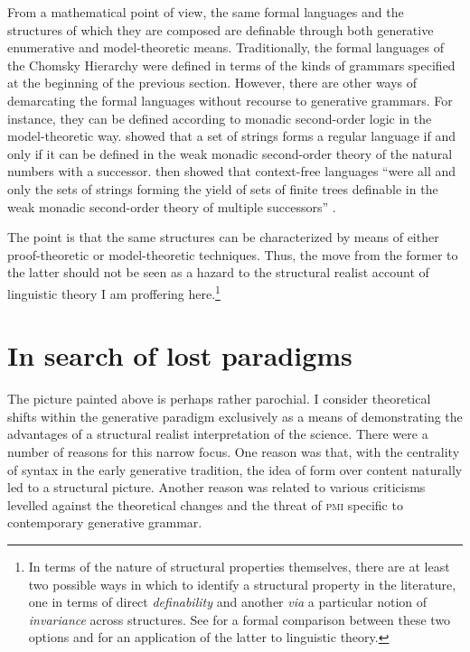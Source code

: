 \documentclass[output=paper]{langscibook}
\begin{document}
From a mathematical point of view, the same formal languages and the structures of which they are composed are definable through both generative enumerative and model-theoretic means. Traditionally, the formal languages of the Chomsky Hierarchy were defined in terms of the kinds of grammars specified at the beginning of the previous section. However, there are other ways of demarcating the formal languages without recourse to generative grammars. For instance, they can be defined according to monadic second-order logic in the model-theoretic way. \cite{Buchi1960} showed that a set of strings forms a regular language if and only if it can be defined in the weak monadic second-order theory of the natural numbers with a successor. \cite{Thatcher1968} then showed that context-free languages ``were all and only the sets of strings forming the yield of sets of finite trees definable in the weak monadic second-order theory of multiple successors'' \citep[1117]{Rogers1998b}.

The point is that the same structures can be characterized by means of either proof-theoretic or model-theoretic techniques. Thus, the move from the former to the latter should not be seen as a hazard to the structural realist account of linguistic theory I am proffering here.\footnote{In terms of the nature of structural properties themselves, there are at least two possible ways in which to identify a structural property in the literature, one in terms of direct \textit{definability} and another \emph{via} a particular notion of \textit{invariance} across structures. See \cite{Korbmacher2017} for a formal comparison between these two options and \cite{Johnson2015} for an application of the latter to linguistic theory.} 

\section{In search of lost paradigms}
\label{sec:nefdt:lostparadigms}

The picture painted above is perhaps rather parochial. I consider theoretical shifts within the generative paradigm exclusively as a means of demonstrating the advantages of a structural realist interpretation of the science. There were a number of reasons for this narrow focus. One reason was that, with the centrality of syntax in the early generative tradition, the idea of form over content naturally led to a structural picture. Another reason was related to various criticisms levelled against the theoretical changes and the threat of \textsc{pmi} specific to contemporary generative grammar. 
\end{document}
